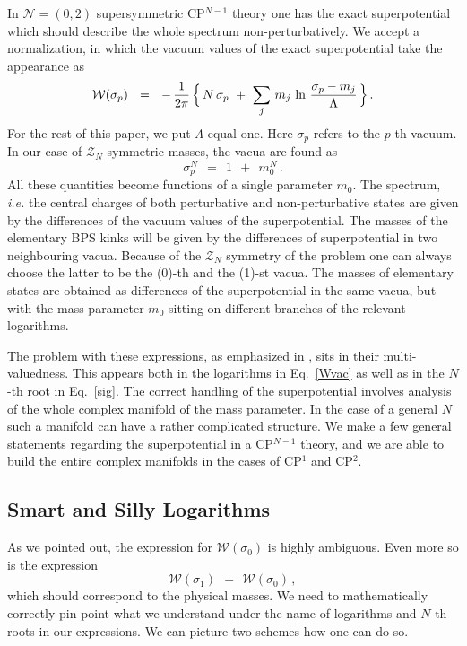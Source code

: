\documentclass[epsfig,12pt]{article}
\def\beq{\begin{equation}}
\def\eeq{\end{equation}}
\def\beq{\begin{equation}}
\def\eeq{\end{equation}}
\newcommand{\ntwoo}{${\mathcal N}= \left(0,2\right) $ }
\newcommand{\mc}[1]{\mathcal{#1}}
\newcommand{\W}{\mathcal{W}}
\begin{document}
	In \ntwoo supersymmetric CP$^{N-1}$ theory one has the exact superpotential which
	should describe the whole spectrum non-perturbatively.
	We accept a normalization, in which the vacuum values of the exact superpotential take 
	the appearance as
\beq
\label{Wvac}
	\W ( \sigma_p ) ~~=~~ 
		-\, \frac{1}{2\pi}\,  
                \Bigl\{\, N\, \sigma_p ~+~ \sum_j\, m_j\, \ln \,\frac{\sigma_p - m_j}{\Lambda} \,\Bigr\}\,.
\eeq
	For the rest of this paper, we put $ \Lambda $ equal one.
	Here $ \sigma_p $ refers to the $p$-th vacuum.
	In our case of $ \mc{Z}_N $-symmetric masses, the vacua are found as
\beq
\label{sig}
	\sigma_p^N  ~~=~~ 1 ~~+~~ m_0^N \,.
\eeq
	All these quantities become functions of a single parameter $ m_0 $.
	The spectrum, {\it i.e.} the central charges of both perturbative and non-perturbative states 
	are given by the differences of the vacuum values of the superpotential.
	The masses of the elementary BPS kinks will be given by the differences of superpotential in
	two neighbouring vacua.
	Because of the $ \mc{Z}_N $ symmetry of the problem one can always choose the latter to be 
	the (0)-th and the (1)-st vacua.
	The masses of elementary states are obtained as differences of the superpotential in the
	same vacua, but with the mass parameter $ m_0 $ sitting on different branches of 
	the relevant logarithms.

	The problem with these expressions, as emphasized in \cite{Bolokhov:2011mp}, sits in their 
	multi-valuedness.
	This appears both in the logarithms in Eq.~\eqref{Wvac} as well as in the $ N $-th root in Eq.~\eqref{sig}.
	The correct handling of the superpotential involves analysis of the whole complex manifold
	of the mass parameter.
	In the case of a general $ N $ such a manifold can have a rather complicated structure.
	We make a few general statements regarding the superpotential in a CP$^{N-1}$ theory,
	and we are able to build the entire complex manifolds in the cases of 
	CP$^1$ and CP$^2$.

\subsection{Smart and Silly Logarithms}

	As we pointed out, the expression for $ \mc{W}(\sigma_0) $ is highly ambiguous.
	Even more so is the expression
\beq
\label{diff}
	\mc{W}(\sigma_1) ~~-~~ \mc{W}(\sigma_0)\,,
\eeq
	which should correspond to the physical masses.
	We need to mathematically correctly pin-point what we understand under the name of logarithms 
	and $ N $-th roots in our expressions.
	We can picture two schemes how one can do so. 
\end{document}
